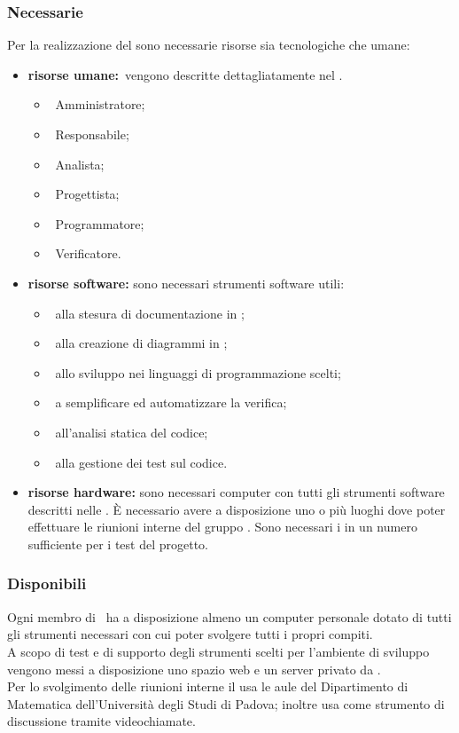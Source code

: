 		\subsubsection{Necessarie}
			Per la realizzazione del  sono necessarie risorse sia tecnologiche che umane:
			\begin{itemize}
				\item \textbf{risorse umane:}\ vengono descritte dettagliatamente nel \PPdoc.
				\begin{itemize}
					\item\ Amministratore;
					\item\ Responsabile;
					\item\ Analista;
					\item\ Progettista;
					\item\ Programmatore;
					\item\ Verificatore.
				\end{itemize}
				\item \textbf{risorse software:} sono necessari strumenti software utili:
				\begin{itemize}
					\item\ alla stesura di documentazione in \gl{\LaTeX};
					\item\ alla creazione di diagrammi in ;
					\item\ allo sviluppo nei linguaggi di programmazione scelti;
					\item\ a semplificare ed automatizzare la verifica;
					\item\ all'analisi statica del codice;
					\item\ alla gestione dei test sul codice.
				\end{itemize}
				\item \textbf{risorse hardware:} sono necessari computer con tutti gli strumenti software descritti nelle \NPdoc. È necessario avere a disposizione uno o più luoghi dove poter effettuare le riunioni interne del gruppo \AUTORE. Sono necessari i  in un numero sufficiente per i test del progetto.
			\end{itemize}
		\subsubsection{Disponibili}
			Ogni membro di \AUTORE\ ha a disposizione almeno un computer personale dotato di tutti gli strumenti necessari con cui poter svolgere tutti i propri compiti. \\
			A scopo di test e di supporto degli strumenti scelti per l'ambiente di sviluppo vengono messi a disposizione uno spazio web e un server privato da \PROPONENTE. \\
			Per lo svolgimento delle riunioni interne il  usa le aule del Dipartimento di Matematica dell'Università degli Studi di Padova; inoltre usa  come strumento di discussione tramite videochiamate.
